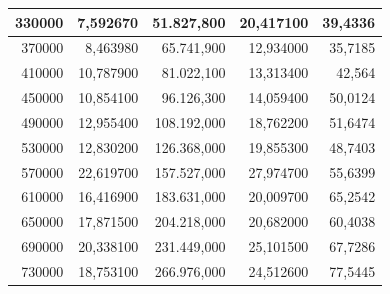 \documentclass[a4paper, 12pt]{article}
\begin{document}
\begin{longtable}[c]{@{}rrrrr@{}}
	\multicolumn{1}{|r|}{330000}                  & \multicolumn{1}{r|}{7,592670}      & \multicolumn{1}{r|}{51.827,800}    & \multicolumn{1}{r|}{20,417100}     & \multicolumn{1}{r|}{39,4336}       \\* \midrule
	\multicolumn{1}{|r|}{370000}                  & \multicolumn{1}{r|}{8,463980}      & \multicolumn{1}{r|}{65.741,900}    & \multicolumn{1}{r|}{12,934000}     & \multicolumn{1}{r|}{35,7185}       \\* \midrule
	\multicolumn{1}{|r|}{410000}                  & \multicolumn{1}{r|}{10,787900}     & \multicolumn{1}{r|}{81.022,100}    & \multicolumn{1}{r|}{13,313400}     & \multicolumn{1}{r|}{42,564}        \\* \midrule
	\multicolumn{1}{|r|}{450000}                  & \multicolumn{1}{r|}{10,854100}     & \multicolumn{1}{r|}{96.126,300}    & \multicolumn{1}{r|}{14,059400}     & \multicolumn{1}{r|}{50,0124}       \\* \midrule
	\multicolumn{1}{|r|}{490000}                  & \multicolumn{1}{r|}{12,955400}     & \multicolumn{1}{r|}{108.192,000}   & \multicolumn{1}{r|}{18,762200}     & \multicolumn{1}{r|}{51,6474}       \\* \midrule
	\multicolumn{1}{|r|}{530000}                  & \multicolumn{1}{r|}{12,830200}     & \multicolumn{1}{r|}{126.368,000}   & \multicolumn{1}{r|}{19,855300}     & \multicolumn{1}{r|}{48,7403}       \\* \midrule
	\multicolumn{1}{|r|}{570000}                  & \multicolumn{1}{r|}{22,619700}     & \multicolumn{1}{r|}{157.527,000}   & \multicolumn{1}{r|}{27,974700}     & \multicolumn{1}{r|}{55,6399}       \\* \midrule
	\multicolumn{1}{|r|}{610000}                  & \multicolumn{1}{r|}{16,416900}     & \multicolumn{1}{r|}{183.631,000}   & \multicolumn{1}{r|}{20,009700}     & \multicolumn{1}{r|}{65,2542}       \\* \midrule
	\multicolumn{1}{|r|}{650000}                  & \multicolumn{1}{r|}{17,871500}     & \multicolumn{1}{r|}{204.218,000}   & \multicolumn{1}{r|}{20,682000}     & \multicolumn{1}{r|}{60,4038}       \\* \midrule
	\multicolumn{1}{|r|}{690000}                  & \multicolumn{1}{r|}{20,338100}     & \multicolumn{1}{r|}{231.449,000}   & \multicolumn{1}{r|}{25,101500}     & \multicolumn{1}{r|}{67,7286}       \\* \midrule
	\multicolumn{1}{|r|}{730000}                  & \multicolumn{1}{r|}{18,753100}     & \multicolumn{1}{r|}{266.976,000}   & \multicolumn{1}{r|}{24,512600}     & \multicolumn{1}{r|}{77,5445}       \\* \midrule

\end{longtable}
\end{document}
